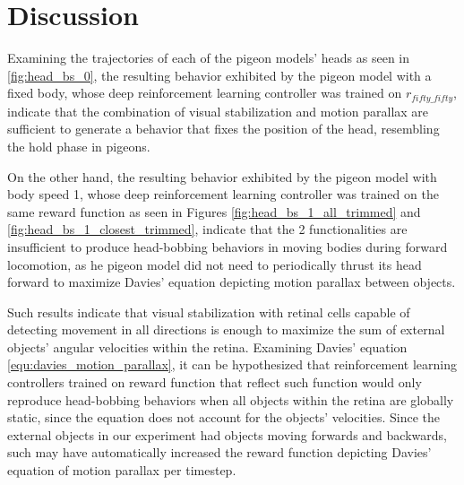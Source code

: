 \chapter{Discussion} \label{ch:discussion}
  Examining the trajectories of each of the pigeon models' heads as seen in \ref{fig:head_bs_0}, the resulting behavior exhibited by the pigeon model with a fixed body, whose deep reinforcement learning controller was trained on $r_{fifty\_fifty}$, indicate that the combination of visual stabilization and motion parallax are sufficient to generate a behavior that fixes the position of the head, resembling the hold phase in pigeons.

  On the other hand, the resulting behavior exhibited by the pigeon model with body speed 1, whose deep reinforcement learning controller was trained on the same reward function as seen in Figures \ref{fig:head_bs_1_all_trimmed} and \ref{fig:head_bs_1_closest_trimmed}, indicate that the 2 functionalities are insufficient to produce head-bobbing behaviors in moving bodies during forward locomotion, as he pigeon model did not need to periodically thrust its head forward to maximize Davies' equation depicting motion parallax between objects.

  Such results indicate that visual stabilization with retinal cells capable of detecting movement in all directions is enough to maximize the sum of external objects' angular velocities within the retina.
    Examining Davies' equation \ref{equ:davies_motion_parallax}, it can be hypothesized that reinforcement learning controllers trained on reward function that reflect such function would only reproduce head-bobbing behaviors when all objects within the retina are globally static, since the equation does not account for the objects' velocities.
    Since the external objects in our experiment had objects moving forwards and backwards, such may have automatically increased the reward function depicting Davies' equation of motion parallax per timestep.


